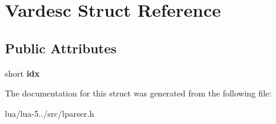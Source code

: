 \hypertarget{struct_vardesc}{\section{Vardesc Struct Reference}
\label{struct_vardesc}
}
\subsection*{Public Attributes}
\begin{DoxyCompactItemize}
\item 
\hypertarget{struct_vardesc_ac32e21dd30359d44b9944038cef986b9}{short {\bfseries idx}}\label{struct_vardesc_ac32e21dd30359d44b9944038cef986b9}

\end{DoxyCompactItemize}


The documentation for this struct was generated from the following file\+:\begin{DoxyCompactItemize}
\item 
lua/lua-\/5../src/lparser.\+h\end{DoxyCompactItemize}
